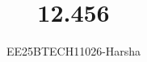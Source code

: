 \documentclass[journal]{IEEEtran}
\begin{document}

\vspace{3cm}

\title{12.456}
\author{EE25BTECH11026-Harsha}
 \maketitle
{\let\newpage\relax\maketitle}

\renewcommand{\thefigure}{\theenumi}
\renewcommand{\thetable}{\theenumi}
\setlength{\intextsep}{10pt} %


\renewcommand{\thetable}{\theenumi}
\end{document}
